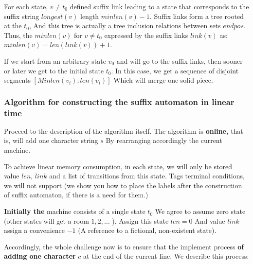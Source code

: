 For each state, $v \ne t_0$ defined suffix link leading to a state that corresponds to the suffix string $longest (v)$ length $minlen (v) -1$. Suffix links form a tree rooted at the $t_0$, And this tree is actually a tree inclusion relations between sets $endpos$.
Thus, the $minlen (v)$ for $v \ne t_0$ expressed by the suffix links $link (v)$ as:
$minlen (v) = len (link (v)) + 1.$

If we start from an arbitrary state $v_0$ and will go to the suffix links, then sooner or later we get to the initial state $t_0$. In this case, we get a sequence of disjoint segments $[Minlen (v_i); len (v_i)]$ Which will merge one solid piece.
\subsubsection{ Algorithm for constructing the suffix automaton in linear time }

Proceed to the description of the algorithm itself. The algorithm is \textbf{online,} that is, will add one character string $s$ By rearranging accordingly the current machine.

To achieve linear memory consumption, in each state, we will only be stored value $len$, $link$ and a list of transitions from this state. Tags terminal conditions, we will not support (we show you how to place the labels after the construction of suffix automaton, if there is a need for them.)

\textbf{Initially the} machine consists of a single state $t_0$ We agree to assume zero state (other states will get a room $1, 2, \ldots$ ). Assign this state $len = 0$ And value $link$ assign a convenience $-1$ (A reference to a fictional, non-existent state).

Accordingly, the whole challenge now is to ensure that the implement process \textbf{of adding one character} $c$ at the end of the current line. We describe this process:

